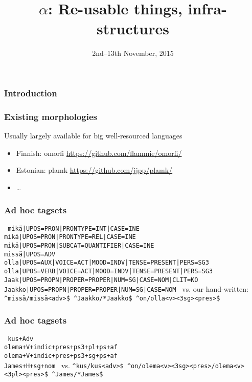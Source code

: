 \documentclass[10pt,xetex]{beamer} %
\date{2nd--13th November, 2015}
\title{$\alpha$: Re-usable things, infra-structures}
\begin{document}
\begin{frame}
        \titlepage
\MyLogoBottomCentred
\end{frame}


\begin{frame}
  \frametitle{Introduction}

\end{frame}


\begin{frame}
  \frametitle{Existing morphologies}
  Usually largely available for big well-resourced languages
    \begin{itemize}
        \item Finnish: omorfi \url{https://github.com/flammie/omorfi/}
        \item Estonian: plamk \url{https://github.com/jjpp/plamk/}
        \item \ldots
    \end{itemize}

\end{frame}

\begin{frame}
  \frametitle{Ad hoc tagsets}
  \texttt{
mikä|UPOS=PRON|PRONTYPE=INT|CASE=INE  \\
mikä|UPOS=PRON|PRONTYPE=REL|CASE=INE  \\
mikä|UPOS=PRON|SUBCAT=QUANTIFIER|CASE=INE  \\
missä|UPOS=ADV \\
olla|UPOS=AUX|VOICE=ACT|MOOD=INDV|TENSE=PRESENT|PERS=SG3  \\
olla|UPOS=VERB|VOICE=ACT|MOOD=INDV|TENSE=PRESENT|PERS=SG3  \\
Jaak|UPOS=PROPN|PROPER=PROPER|NUM=SG|CASE=NOM|CLIT=KO  \\
Jaakko|UPOS=PROPN|PROPER=PROPER|NUM=SG|CASE=NOM }
vs. our hand-written:
\texttt{\textasciicircum missä/missä<adv>\$
\textasciicircum Jaakko/*Jaakko\$
\textasciicircum on/olla<v><3sg><pres>\$}
\end{frame}

\begin{frame}
  \frametitle{Ad hoc tagsets}
  \texttt{
kus+Adv \\
olema+V+indic+pres+ps3+pl+ps+af \\
olema+V+indic+pres+ps3+sg+ps+af \\
James+H+sg+nom
}
vs. 
\texttt{\textasciicircum kus/kus<adv>\$
\textasciicircum on/olema<v><3sg><pres>/olema<v><3pl><pres>\$
\textasciicircum James/*James\$}

\end{frame}
\end{document}
